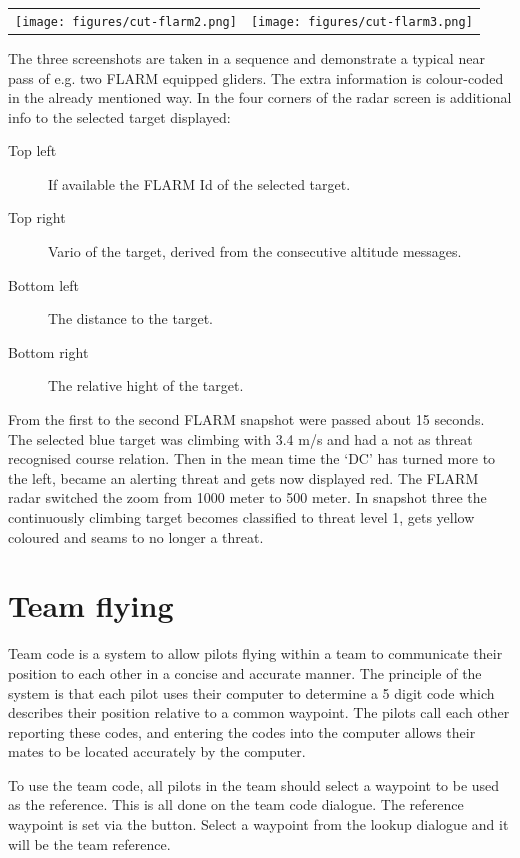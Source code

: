 \begin{center}
\begin{tabular}{c c}
\texttt{[image: figures/cut-flarm2.png]}&
\texttt{[image: figures/cut-flarm3.png]}\\
\end{tabular}
\end{center}
The three screenshots are taken in a sequence and demonstrate a typical near
pass of e.g. two FLARM equipped gliders. The extra information is colour-coded
in the already mentioned way. In the four corners of the radar screen is
additional info to the selected target displayed:

\begin{description}
\item[Top left]  If available the FLARM Id of the selected target.
\item[Top right]  Vario of the target, derived from the consecutive altitude
messages.
\item[Bottom left]  The distance to the target.
\item[Bottom right]  The relative hight of the target.
\end{description}

From the first to the second FLARM snapshot were passed about 15 seconds. The
selected blue target was climbing with 3.4 m/s and had a not as threat
recognised course relation.  Then in the mean time the `DC' has turned more to
the left, became an alerting threat and gets now displayed red.  The FLARM
radar switched the zoom from 1000 meter to 500 meter. In snapshot three the
continuously climbing target becomes classified to threat level 1, gets yellow
coloured and seams to no longer a threat.


\section{Team flying}\label{sec:team-flying}

Team code is a system to allow pilots flying within a team to
communicate their position to each other in a concise and accurate
manner.  The principle of the system is that each pilot uses their
computer to determine a 5 digit code which describes their position
relative to a common waypoint.  The pilots call each other reporting
these codes, and entering the codes into the computer allows their
mates to be located accurately by the computer.

To use the team code, all pilots in the team should select a waypoint to
be used as the reference.  This is all done on the team code dialogue.
The reference waypoint is set
via the  button. Select a waypoint from the lookup dialogue
and it will be the team reference.

